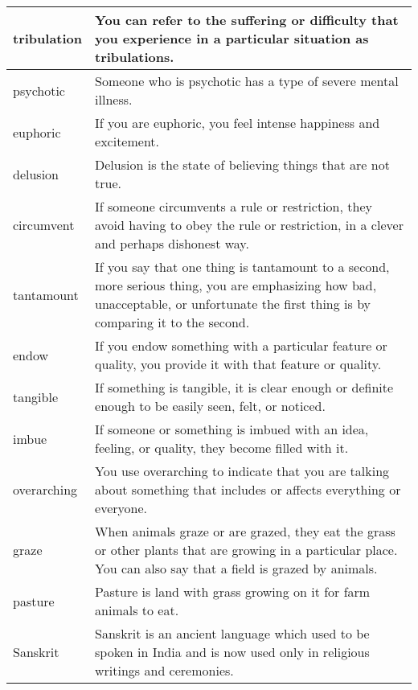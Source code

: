 \documentclass{article}
\begin{document}
\begin{center}
\begin{longtable}{|l|p{7cm}|}
\hline
tribulation
&
You can refer to the suffering or difficulty that you experience in a particular situation as tribulations.
\\

\hline
psychotic
&
Someone who is psychotic has a type of severe mental illness.
\\

\hline
euphoric
&
If you are euphoric, you feel intense happiness and excitement.
\\

\hline
delusion
&
Delusion is the state of believing things that are not true.
\\

\hline
circumvent
&
If someone circumvents a rule or restriction, they avoid having to obey the rule or restriction, in a clever and perhaps dishonest way.
\\

\hline
tantamount
&
If you say that one thing is tantamount to a second, more serious thing, you are emphasizing how bad, unacceptable, or unfortunate the first thing is by comparing it to the second.
\\

\hline
endow
&
If you endow something with a particular feature or quality, you provide it with that feature or quality.
\\

\hline
tangible
&
If something is tangible, it is clear enough or definite enough to be easily seen, felt, or noticed.
\\

\hline
imbue
&
If someone or something is imbued with an idea, feeling, or quality, they become filled with it.
\\

\hline
overarching
&
You use overarching to indicate that you are talking about something that includes or affects everything or everyone.
\\

\hline
graze
&
When animals graze or are grazed, they eat the grass or other plants that are growing in a particular place. You can also say that a field is grazed by animals.
\\

\hline
pasture
&
Pasture is land with grass growing on it for farm animals to eat.
\\

\hline
Sanskrit
&
Sanskrit is an ancient language which used to be spoken in India and is now used only in religious writings and ceremonies.
\\


\end{longtable}
\end{center}
\end{document}
